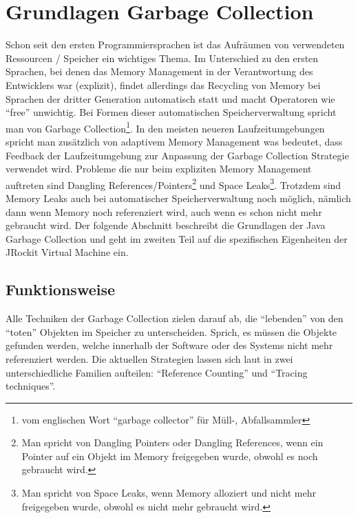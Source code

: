 \chapter{Grundlagen Garbage Collection}\label{grundlagen_gc}
Schon seit den ersten Programmiersprachen ist das Aufräumen von verwendeten Ressourcen / Speicher ein wichtiges Thema. Im Unterschied zu den ersten Sprachen, bei denen das Memory Management in der Verantwortung des Entwicklers war (explizit), findet allerdings das Recycling von Memory bei Sprachen der dritter Generation automatisch statt und macht Operatoren wie ``free'' unwichtig. Bei Formen dieser automatischen Speicherverwaltung spricht man von Garbage Collection\footnote{vom englischen Wort ``garbage collector'' für Müll-, Abfallsammler}. In den meisten neueren Laufzeitumgebungen spricht man zusätzlich von adaptivem Memory Management was bedeutet, dass Feedback der Laufzeitumgebung zur Anpassung der Garbage Collection Strategie verwendet wird.
Probleme die nur beim expliziten Memory Management auftreten sind  Dangling References/Pointers\footnote{Man spricht von Dangling Pointers oder Dangling References, wenn ein Pointer auf ein Objekt im Memory freigegeben wurde, obwohl es noch gebraucht wird.} und Space Leaks\footnote{Man spricht von Space Leaks, wenn Memory alloziert und nicht mehr freigegeben wurde, obwohl es nicht mehr gebraucht wird.\cite{sunMemoryManagementWP}}. Trotzdem sind Memory Leaks auch bei automatischer Speicherverwaltung noch möglich, nämlich dann wenn Memory noch referenziert wird, auch wenn es schon nicht mehr gebraucht wird.
Der folgende Abschnitt beschreibt die Grundlagen der Java Garbage Collection und geht im zweiten Teil auf die spezifischen Eigenheiten der JRockit Virtual Machine ein.

\section{Funktionsweise}
Alle Techniken der Garbage Collection zielen darauf ab, die ``lebenden'' von den ``toten'' Objekten im Speicher zu unterscheiden. Sprich, es müssen die Objekte gefunden werden, welche innerhalb der Software oder des Systems nicht mehr referenziert werden. Die aktuellen Strategien lassen sich laut\cite[S. 77]{lagergren2010oracle} in zwei unterschiedliche Familien aufteilen: ``Reference Counting'' und ``Tracing techniques''.

